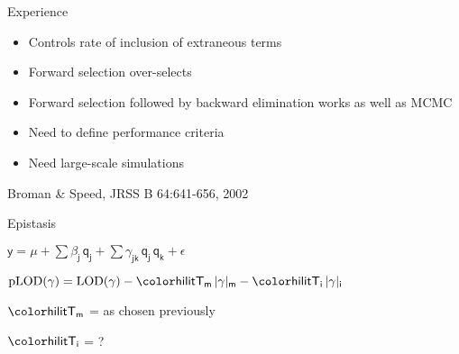 \documentclass[aspectratio=169,12pt,t]{beamer}
\newcommand{\lod}{\text{LOD}}
\newcommand{\plod}{\text{pLOD}}
\begin{document}
\begin{frame}{Experience}


\hfill \begin{minipage}{10in}

\begin{itemize}
\itemsep18pt
\item Controls rate of inclusion of extraneous terms
\item Forward selection over-selects
\item {\lolit Forward selection followed by backward elimination} works as well
  as {\lolit MCMC}

\item {\hilit Need to define performance criteria}
\item {\hilit Need large-scale simulations}
\end{itemize}

\vspace{6cm}


\hfill Broman \& Speed, JRSS B 64:641-656, 2002

\end{minipage}


\end{frame}







\begin{frame}{Epistasis}


\hfill \begin{minipage}{10in}

\centerline{
$\mathsf{y  = \mu + \sum \beta_j \, q_j + \sum \gamma_{jk} \, q_j \,
    q_k + \epsilon}$
}

\vspace{3cm}

{\color{myyellow}
$\mathsf{ \plod(\gamma) = \lod(\gamma) -
    {\hilit T_m} \, |\gamma|_m - {\hilit T_i} \, |\gamma|_i }$
}


\vspace{15mm}

\hspace{3cm} $\mathsf{\hilit T_m}$ = as chosen previously

\vspace{15mm}

\hspace{3cm} $\mathsf{\hilit T_i}$ = ?



\end{minipage}

\end{frame}
\end{document}
